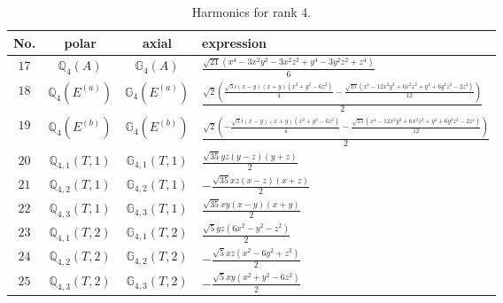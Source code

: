\documentclass[fleqn,8pt,landscape]{jsarticle}
\begin{document}
\begin{table}[ht!]
\begin{center}
\caption{Harmonics for rank 4.}
\renewcommand{\arraystretch}{1.3}
\begin{tabular}{cccl} \hline \hline
No. & polar & axial & expression \\ \hline
$ 17 $ & $ \mathbb{Q}_{4}(A) $ & $ \mathbb{G}_{4}(A) $ & $ \frac{\sqrt{21} \left(x^{4} - 3 x^{2} y^{2} - 3 x^{2} z^{2} + y^{4} - 3 y^{2} z^{2} + z^{4}\right)}{6} $ \\
$ 18 $ & $ \mathbb{Q}_{4}(E^{(a)}) $ & $ \mathbb{G}_{4}(E^{(a)}) $ & $ \frac{\sqrt{2} \left(\frac{\sqrt{5} i \left(x - y\right) \left(x + y\right) \left(x^{2} + y^{2} - 6 z^{2}\right)}{4} - \frac{\sqrt{15} \left(x^{4} - 12 x^{2} y^{2} + 6 x^{2} z^{2} + y^{4} + 6 y^{2} z^{2} - 2 z^{4}\right)}{12}\right)}{2} $ \\
$ 19 $ & $ \mathbb{Q}_{4}(E^{(b)}) $ & $ \mathbb{G}_{4}(E^{(b)}) $ & $ \frac{\sqrt{2} \left(- \frac{\sqrt{5} i \left(x - y\right) \left(x + y\right) \left(x^{2} + y^{2} - 6 z^{2}\right)}{4} - \frac{\sqrt{15} \left(x^{4} - 12 x^{2} y^{2} + 6 x^{2} z^{2} + y^{4} + 6 y^{2} z^{2} - 2 z^{4}\right)}{12}\right)}{2} $ \\
$ 20 $ & $ \mathbb{Q}_{4,1}(T,1) $ & $ \mathbb{G}_{4,1}(T,1) $ & $ \frac{\sqrt{35} y z \left(y - z\right) \left(y + z\right)}{2} $ \\
$ 21 $ & $ \mathbb{Q}_{4,2}(T,1) $ & $ \mathbb{G}_{4,2}(T,1) $ & $ - \frac{\sqrt{35} x z \left(x - z\right) \left(x + z\right)}{2} $ \\
$ 22 $ & $ \mathbb{Q}_{4,3}(T,1) $ & $ \mathbb{G}_{4,3}(T,1) $ & $ \frac{\sqrt{35} x y \left(x - y\right) \left(x + y\right)}{2} $ \\
$ 23 $ & $ \mathbb{Q}_{4,1}(T,2) $ & $ \mathbb{G}_{4,1}(T,2) $ & $ \frac{\sqrt{5} y z \left(6 x^{2} - y^{2} - z^{2}\right)}{2} $ \\
$ 24 $ & $ \mathbb{Q}_{4,2}(T,2) $ & $ \mathbb{G}_{4,2}(T,2) $ & $ - \frac{\sqrt{5} x z \left(x^{2} - 6 y^{2} + z^{2}\right)}{2} $ \\
$ 25 $ & $ \mathbb{Q}_{4,3}(T,2) $ & $ \mathbb{G}_{4,3}(T,2) $ & $ - \frac{\sqrt{5} x y \left(x^{2} + y^{2} - 6 z^{2}\right)}{2} $ \\
 \hline \hline
\end{tabular}
\end{center}
\end{table}
\end{document}
